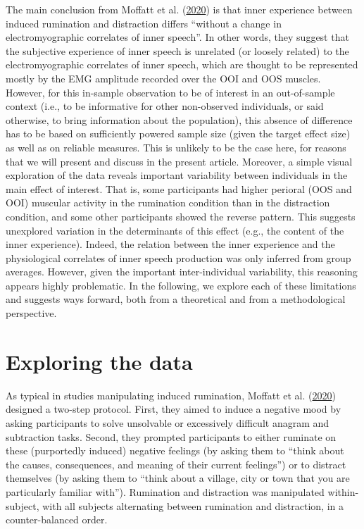 \documentclass[
  english,
  man, donotrepeattitle,floatsintext]{apa6}
\begin{document}
The main conclusion from Moffatt et al. (\protect\hyperlink{ref-moffatt_inner_2020}{2020}) is that inner experience between induced rumination and distraction differs ``without a change in electromyographic correlates of inner speech''. In other words, they suggest that the subjective experience of inner speech is unrelated (or loosely related) to the electromyographic correlates of inner speech, which are thought to be represented mostly by the EMG amplitude recorded over the OOI and OOS muscles. However, for this in-sample observation to be of interest in an out-of-sample context (i.e., to be informative for other non-observed individuals, or said otherwise, to bring information about the population), this absence of difference has to be based on sufficiently powered sample size (given the target effect size) as well as on reliable measures. This is unlikely to be the case here, for reasons that we will present and discuss in the present article. Moreover, a simple visual exploration of the data reveals important variability between individuals in the main effect of interest. That is, some participants had higher perioral (OOS and OOI) muscular activity in the rumination condition than in the distraction condition, and some other participants showed the reverse pattern. This suggests unexplored variation in the determinants of this effect (e.g., the content of the inner experience). Indeed, the relation between the inner experience and the physiological correlates of inner speech production was only inferred from group averages. However, given the important inter-individual variability, this reasoning appears highly problematic. In the following, we explore each of these limitations and suggests ways forward, both from a theoretical and from a methodological perspective.

\hypertarget{exploring-the-data}{%
\section{Exploring the data}\label{exploring-the-data}}

As typical in studies manipulating induced rumination, Moffatt et al. (\protect\hyperlink{ref-moffatt_inner_2020}{2020}) designed a two-step protocol. First, they aimed to induce a negative mood by asking participants to solve unsolvable or excessively difficult anagram and subtraction tasks. Second, they prompted participants to either ruminate on these (purportedly induced) negative feelings (by asking them to ``think about the causes, consequences, and meaning of their current feelings'') or to distract themselves (by asking them to ``think about a village, city or town that you are particularly familiar with''). Rumination and distraction was manipulated within-subject, with all subjects alternating between rumination and distraction, in a counter-balanced order.
\end{document}
